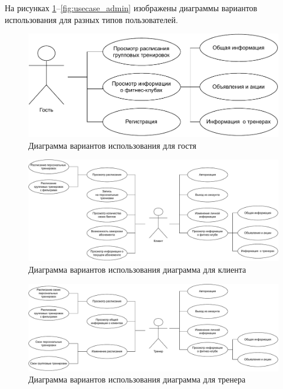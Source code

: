 На рисунках \ref{fig:usecase_guest}--\ref{fig:usecase_admin} изображены диаграммы вариантов использования для разных типов пользователей.

\begin{figure}[h!]
	\centering
	\includegraphics[width=0.7\linewidth]{img/usecase-guest}
	\caption{Диаграмма вариантов использования для гостя}
	\label{fig:usecase_guest}
\end{figure}

\begin{figure}[h!]
	\centering
	\includegraphics[width=0.95\linewidth]{img/usecase-client}
	\caption{Диаграмма вариантов использования диаграмма для клиента}
	\label{fig:usecase_client}
\end{figure}
\clearpage

\begin{figure}[h!]
	\centering
	\includegraphics[width=0.95\linewidth]{img/usecase-trainer}
	\caption{Диаграмма вариантов использования диаграмма для тренера}
	\label{fig:usecase_trainer}
\end{figure}

